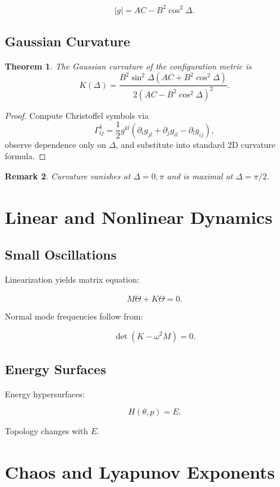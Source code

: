 \documentclass[11pt,oneside]{book}
\newtheorem{theorem}{Theorem}[chapter]
\newtheorem{remark}[theorem]{Remark}
\begin{document}
\[
|g|=AC-B^2\cos^2\Delta.
\]

\section{Gaussian Curvature}

\begin{theorem}
The Gaussian curvature of the configuration metric is
\[
K(\Delta)
=
\frac{B^2 \sin^2\Delta
(AC+B^2\cos^2\Delta)}
{2(AC-B^2\cos^2\Delta)^2}.
\]
\end{theorem}

\begin{proof}
Compute Christoffel symbols via
\[
\Gamma^k_{ij}=\frac12 g^{kl}
(\partial_i g_{jl}
+\partial_j g_{il}
-\partial_l g_{ij}),
\]
observe dependence only on $\Delta$,
and substitute into standard 2D curvature formula.
\end{proof}

\begin{remark}
Curvature vanishes at $\Delta=0,\pi$ and is maximal at $\Delta=\pi/2$.
\end{remark}

\chapter{Linear and Nonlinear Dynamics}

\section{Small Oscillations}

Linearization yields matrix equation:

\[
M\ddot{\Theta}+K\Theta=0.
\]

Normal mode frequencies follow from:

\[
\det(K-\omega^2 M)=0.
\]

\section{Energy Surfaces}

Energy hypersurfaces:

\[
H(\theta,p)=E.
\]

Topology changes with $E$.

\chapter{Chaos and Lyapunov Exponents}
\end{document}
